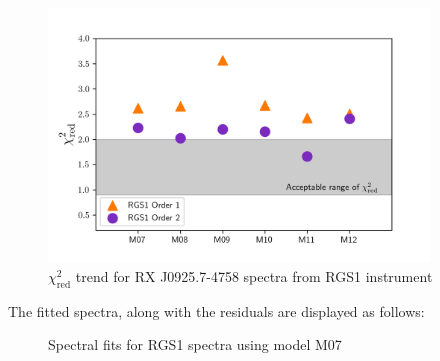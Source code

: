 			\begin{figure}[h!]
				\centering
				\includegraphics[width=0.9\textwidth]{mrvel-rgs1-chisq}
				\caption{$\chi^2_\text{red}$ trend for RX J0925.7-4758 spectra from RGS1 instrument}
				\label{fig:mrvel-rgs1-chisq}
			\end{figure}
		
			The fitted spectra, along with the residuals are displayed as follows:
			\begin{figure}[h!]
				\centering
				 \hfill
				\caption{Spectral fits for RGS1 spectra using model M07}
				\label{xmm:rgs1-m07}
			\end{figure}
			

